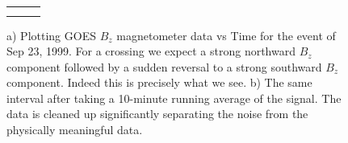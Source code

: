 \documentclass[12pt, letterpaper]{article}
\begin{document}
\begin{figure}
\def\tabularxcolumn#1{m{#1}}
\begin{tabularx}{\linewidth}{@{}cXX@{}}
\begin{tabular}{cc}
   & \\
\end{tabular}
\end{tabularx}
\caption{a) Plotting GOES $B_{z}$ magnetometer data vs Time for the event of Sep 23, 1999. For a crossing we expect a strong northward $B_{z}$ component followed by a sudden reversal to a strong southward $B_{z}$ component. Indeed this is precisely what we see. b) The same interval after taking a 10-minute running average of the signal. The data is cleaned up significantly separating the noise from the physically meaningful data.}
\label{fig:GOES_Bz}
\end{figure}
\end{document}
